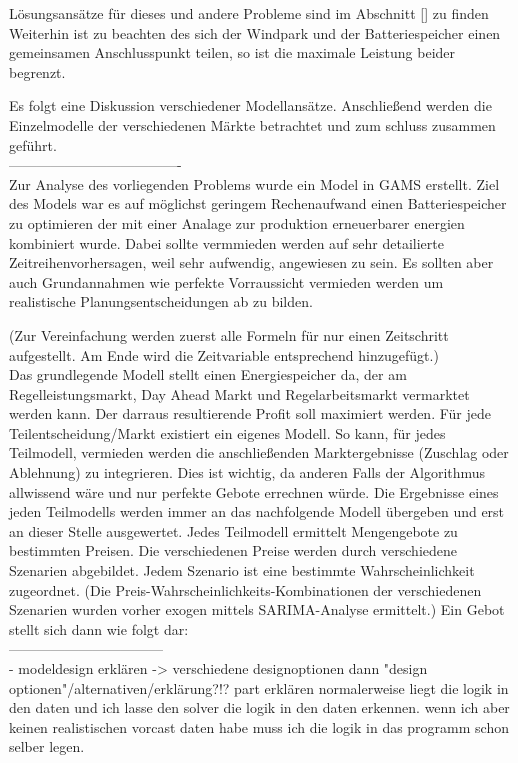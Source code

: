 Lösungsansätze für dieses und andere Probleme sind im Abschnitt [] zu finden
Weiterhin ist zu beachten des sich der Windpark und der Batteriespeicher einen gemeinsamen Anschlusspunkt teilen, so ist die maximale Leistung beider begrenzt.

Es folgt eine Diskussion verschiedener Modellansätze. Anschließend werden die Einzelmodelle der verschiedenen Märkte betrachtet und zum schluss zusammen geführt.\\
-------------------------------------\\
Zur Analyse des vorliegenden Problems wurde ein Model in GAMS erstellt.
Ziel des Models war es auf möglichst geringem Rechenaufwand einen Batteriespeicher zu optimieren der mit
einer Analage zur produktion erneuerbarer energien kombiniert wurde. Dabei sollte vermmieden werden
auf sehr detailierte Zeitreihenvorhersagen, weil sehr aufwendig, angewiesen zu sein. Es sollten aber auch
Grundannahmen wie perfekte Vorraussicht vermieden werden um realistische Planungsentscheidungen ab zu bilden.

(Zur Vereinfachung werden zuerst alle Formeln für nur einen Zeitschritt aufgestellt. Am Ende wird die Zeitvariable entsprechend hinzugefügt.)
\\
Das grundlegende Modell stellt einen Energiespeicher da, der am Regelleistungsmarkt, Day Ahead Markt und Regelarbeitsmarkt vermarktet werden kann.
Der darraus resultierende Profit soll maximiert werden. Für jede Teilentscheidung/Markt existiert ein eigenes Modell. So kann, für jedes Teilmodell,
vermieden werden die anschließenden Marktergebnisse (Zuschlag oder Ablehnung) zu integrieren. Dies ist wichtig, da anderen Falls der
Algorithmus allwissend wäre und nur perfekte Gebote errechnen würde. Die Ergebnisse eines jeden Teilmodells werden immer an das nachfolgende
Modell übergeben und erst an dieser Stelle ausgewertet. Jedes Teilmodell ermittelt Mengengebote zu bestimmten Preisen. Die verschiedenen Preise
werden durch verschiedene Szenarien abgebildet. Jedem Szenario ist eine bestimmte Wahrscheinlichkeit zugeordnet.
(Die Preis-Wahrscheinlichkeits-Kombinationen der verschiedenen Szenarien wurden vorher exogen mittels SARIMA-Analyse ermittelt.)
Ein Gebot stellt sich dann wie folgt dar:\\
---------------------------------\\

- modeldesign erklären
-> verschiedene designoptionen dann "design optionen"/alternativen/erklärung?!? part erklären
normalerweise liegt die logik in den daten und ich lasse den solver die logik in den daten erkennen.
wenn ich aber keinen realistischen vorcast daten habe muss ich die logik in das programm schon selber legen.

